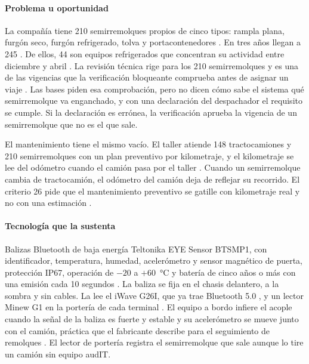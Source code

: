 \paragraph{Problema u oportunidad} La compañía tiene 210 semirremolques propios de cinco tipos: rampla
plana, furgón seco, furgón refrigerado, tolva y portacontenedores . En tres años
llegan a 245 . De ellos, 44 son equipos refrigerados que concentran su
actividad entre diciembre y abril . La revisión técnica rige para los 210
semirremolques  y es una de las vigencias que la verificación bloqueante
comprueba antes de asignar un viaje . Las bases piden esa comprobación, pero no
dicen cómo sabe el sistema qué semirremolque va enganchado, y con una declaración del despachador el
requisito se cumple. Si la declaración es errónea, la verificación aprueba la vigencia de un
semirremolque que no es el que sale.

El mantenimiento tiene el mismo vacío. El taller atiende 148 tractocamiones y 210 semirremolques con
un plan preventivo por kilometraje, y el kilometraje se lee del odómetro cuando el camión pasa por el
taller . Cuando un semirremolque cambia de tractocamión, el odómetro del camión
deja de reflejar su recorrido. El criterio 26 pide que el mantenimiento preventivo se gatille con
kilometraje real y no con una estimación .

\paragraph{Tecnología que la sustenta} Balizas Bluetooth de baja energía Teltonika EYE Sensor BTSMP1,
con identificador, temperatura, humedad, acelerómetro y sensor magnético de puerta, protección IP67,
operación de $-20$ a $+60$~°C y batería de cinco años o más con una emisión cada 10 segundos
\parencite{teltonika_eye}. La baliza se fija en el chasis delantero, a la sombra y sin cables. La lee
el iWave G26I, que ya trae Bluetooth 5.0 \parencite{iwave_g26i}, y un lector Minew G1 en la portería de
cada terminal \parencite{minew_g1}. El equipo a bordo infiere el acople cuando la señal de la baliza es
fuerte y estable y su acelerómetro se mueve junto con el camión, práctica que el fabricante describe
para el seguimiento de remolques \parencite{teltonika_trailer}. El lector de portería registra el
semirremolque que sale aunque lo tire un camión sin equipo audIT.

